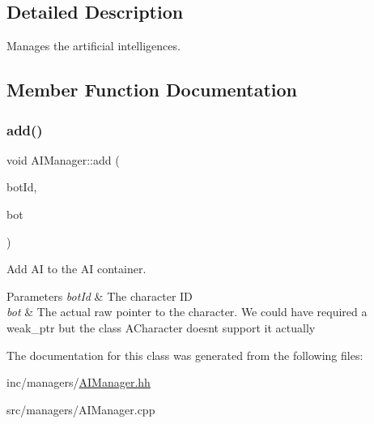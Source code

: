 \subsection{Detailed Description}
Manages the artificial intelligences. 

\subsection{Member Function Documentation}
\mbox{\label{classAIManager_a4722a3719db2ff5ee2f754b539ee2c17}} 
\subsubsection{\texorpdfstring{add()}{add()}}
{\footnotesize\ttfamily void A\+I\+Manager\+::add (\begin{DoxyParamCaption}\item[{Unsigned\+Int}]{bot\+Id,  }\item[{A\+Character $\ast$}]{bot }\end{DoxyParamCaption})}



Add AI to the AI container. 


\begin{DoxyParams}{Parameters}
{\em bot\+Id} & The character ID \\
\hline
{\em bot} & The actual raw pointer to the character. We could have required a weak\+\_\+ptr but the class A\+Character doesnt support it actually \\
\hline
\end{DoxyParams}


The documentation for this class was generated from the following files\+:\begin{DoxyCompactItemize}
\item 
inc/managers/\hyperlink{AIManager_8hh}{A\+I\+Manager.\+hh}\item 
src/managers/A\+I\+Manager.\+cpp\end{DoxyCompactItemize}
